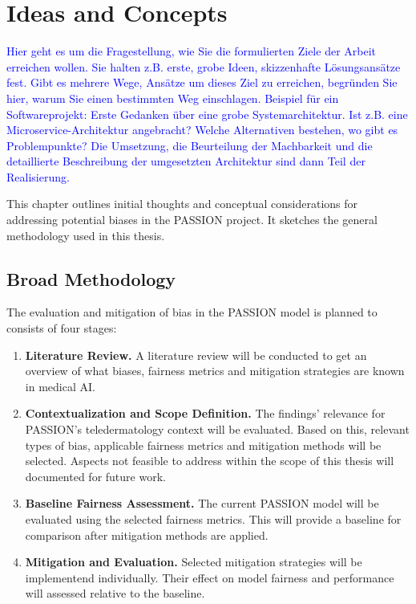 \documentclass[12pt, a4paper, oneside]{book}   	%
\newcommand{\baaCriteria}[1]{\textcolor{blue}{#1}}
\begin{document}
	
	\chapter{Ideas and Concepts}
		\baaCriteria{Hier geht es um die Fragestellung, wie Sie die formulierten Ziele der Arbeit erreichen wollen. Sie halten z.B. erste, grobe Ideen, skizzenhafte Lösungsansätze fest. Gibt es mehrere Wege, Ansätze um dieses Ziel zu erreichen, begründen Sie hier, warum Sie einen bestimmten Weg einschlagen. Beispiel für ein Softwareprojekt: Erste Gedanken über eine grobe Systemarchitektur. Ist z.B. eine Microservice-Architektur angebracht? Welche Alternativen bestehen, wo gibt es Problempunkte? Die Umsetzung, die Beurteilung der Machbarkeit und die detaillierte Beschreibung der umgesetzten Architektur sind dann Teil der Realisierung.}
					
		This chapter outlines initial thoughts and conceptual considerations for addressing potential biases in the PASSION project. It sketches the general methodology used in this thesis.
		
		\section{Broad Methodology}
			The evaluation and mitigation of bias in the PASSION model is planned to consists of four stages:
			\begin{enumerate}
				\item \textbf{Literature Review.} A literature review will be conducted to get an overview of what biases, fairness metrics and mitigation strategies are known in medical \gls{AI}.
				
				\item \textbf{Contextualization and Scope Definition.} The findings' relevance for PASSION's \gls{teledermatology} context will be evaluated. Based on this, relevant types of bias, applicable fairness metrics and mitigation methods will be selected. Aspects not feasible to address within the scope of this thesis will documented for future work.
				
				\item \textbf{Baseline Fairness Assessment.} The current PASSION model will be evaluated using the selected fairness metrics. This will provide a baseline for comparison after mitigation methods are applied.
				
				\item \textbf{Mitigation and Evaluation.} Selected mitigation strategies will be implementend individually. Their effect on model fairness and performance will assessed relative to the baseline.
			\end{enumerate}
		
\end{document}
